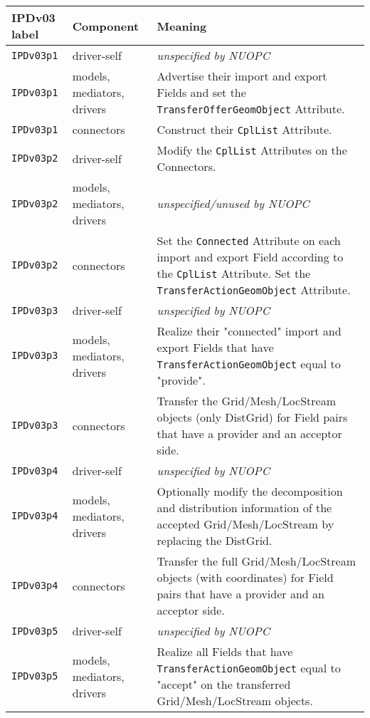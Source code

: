 \vspace*{3ex}
\begin{longtable}[h]{|p{35mm}|p{4cm}|p{6cm}|}
     \hline\hline
     {\bf IPDv03 label} & {\bf Component} & {\bf Meaning}\\
     \hline\hline
     {\tt IPDv03p1} & driver-self                 & {\em unspecified by NUOPC}\\ \hline
     {\tt IPDv03p1} & models, mediators, drivers  & Advertise their import and export Fields and set the {\tt TransferOfferGeomObject} Attribute.\\ \hline
     {\tt IPDv03p1} & connectors                  & Construct their {\tt CplList} Attribute.\\ \hline
     {\tt IPDv03p2} & driver-self                 & Modify the {\tt CplList} Attributes on the Connectors.\\ \hline
     {\tt IPDv03p2} & models, mediators, drivers  & {\em unspecified/unused by NUOPC}\\ \hline
     {\tt IPDv03p2} & connectors                  & Set the {\tt Connected} Attribute on each import and export Field according to the {\tt CplList} Attribute. Set the {\tt TransferActionGeomObject} Attribute.\\ \hline
     {\tt IPDv03p3} & driver-self                 & {\em unspecified by NUOPC}\\ \hline
     {\tt IPDv03p3} & models, mediators, drivers  & Realize their "connected" import and export Fields that have {\tt TransferActionGeomObject} equal to "provide".\\ \hline
     {\tt IPDv03p3} & connectors                  & Transfer the Grid/Mesh/LocStream objects (only DistGrid) for Field pairs that have a provider and an acceptor side.\\ \hline
     {\tt IPDv03p4} & driver-self                 & {\em unspecified by NUOPC}\\ \hline
     {\tt IPDv03p4} & models, mediators, drivers  & Optionally modify the decomposition and distribution information of the accepted Grid/Mesh/LocStream by replacing the DistGrid.\\ \hline
     {\tt IPDv03p4} & connectors                  & Transfer the full Grid/Mesh/LocStream objects (with coordinates) for Field pairs that have a provider and an acceptor side.\\ \hline
     {\tt IPDv03p5} & driver-self                 & {\em unspecified by NUOPC}\\ \hline
     {\tt IPDv03p5} & models, mediators, drivers  & Realize all Fields that have {\tt TransferActionGeomObject} equal to "accept" on the transferred Grid/Mesh/LocStream objects.\\ \hline

\end{longtable}
